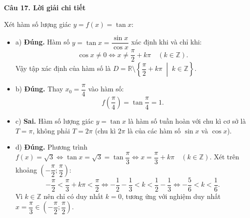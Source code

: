 \documentclass[12pt, a4paper]{article}
\begin{document}
\noindent\textbf{Câu 17. Lời giải chi tiết}\par
\begin{tcolorbox}[enhanced,breakable,colback=solutionbg,colframe=secondary!50!black,frame hidden,borderline west={3pt}{0pt}{secondary!50!black}]
Xét hàm số lượng giác $y = f(x) = \tan x$:
\begin{itemize}[leftmargin=1.5em]
\item a) \textbf{Đúng.} Hàm số $y = \tan x = \dfrac{\sin x}{\cos x}$ xác định khi và chỉ khi:
$$\cos x \ne 0 \Leftrightarrow x \ne \dfrac{\pi}{2} + k\pi\quad (k\in\mathbb{Z}).$$
Vậy tập xác định của hàm số là $D = \mathbb{R}\setminus\left\{\dfrac{\pi}{2} + k\pi \;\middle|\; k\in\mathbb{Z}\right\}$.

\item b) \textbf{Đúng.} Thay $x_0 = \dfrac{\pi}{4}$ vào hàm số:
$$f\left(\dfrac{\pi}{4}\right) = \tan\dfrac{\pi}{4} = 1.$$

\item c) \textbf{Sai.} Hàm số lượng giác $y = \tan x$ là hàm số tuần hoàn với chu kì cơ sở là $T = \pi$, không phải $T = 2\pi$ (chu kì $2\pi$ là của các hàm số $\sin x$ và $\cos x$).

\item d) \textbf{Đúng.} Phương trình $f(x) = \sqrt{3} \Leftrightarrow \tan x = \sqrt{3} = \tan\dfrac{\pi}{3} \Leftrightarrow x = \dfrac{\pi}{3} + k\pi\quad (k\in\mathbb{Z})$.
Xét trên khoảng $\left(-\dfrac{\pi}{2}; \dfrac{\pi}{2}\right)$:
$$-\dfrac{\pi}{2} < \dfrac{\pi}{3} + k\pi < \dfrac{\pi}{2} \Leftrightarrow -\dfrac{1}{2} - \dfrac{1}{3} < k < \dfrac{1}{2} - \dfrac{1}{3} \Leftrightarrow -\dfrac{5}{6} < k < \dfrac{1}{6}.$$
Vì $k \in \mathbb{Z}$ nên chỉ có duy nhất $k = 0$, tương ứng với nghiệm duy nhất $x = \dfrac{\pi}{3} \in \left(-\dfrac{\pi}{2}; \dfrac{\pi}{2}\right)$.
\end{itemize}
\end{tcolorbox}
\end{document}
